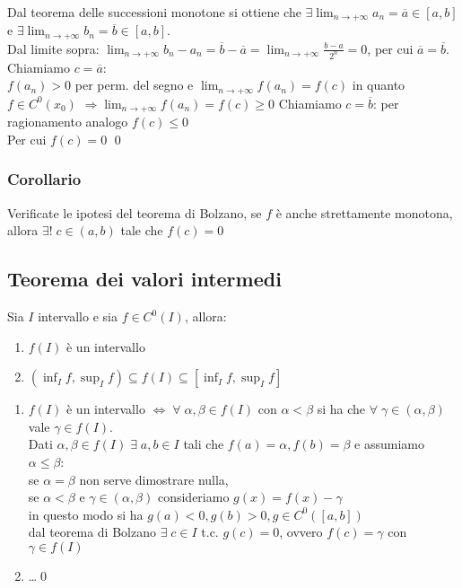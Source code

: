 \documentclass[a4paper]{article}
\newcommand\cont[2]{C^{#1} ({#2})}
\begin{document}
Dal teorema delle successioni monotone si ottiene che \(\displaystyle \exists \lim_{n \to +\infty} a_n = \overline{a} \in \left[a, b\right]\) e
\(\displaystyle \exists \lim_{n \to +\infty} b_n = \overline{b} \in \left[a, b\right]\).\\
Dal limite sopra: \(\displaystyle \lim_{n \to +\infty} b_n - a_n = \overline{b} - \overline{a} = \lim_{n \to +\infty} \frac{b - a}{2^n} = 0\),
per cui \(\overline{a} = \overline{b}\). \\
Chiamiamo \(c = \overline{a}\): \\
\(f(a_n) > 0\) per perm. del segno e \(\displaystyle \lim_{n \to +\infty}f(a_n) = f(c)\) in quanto \(f \in \cont{0}{x_0}\) \(\displaystyle \Rightarrow \lim_{n \to +\infty} f(a_n) = f(c) \geq 0\) 
Chiamiamo \(c = \overline{b}\): per ragionamento analogo \(f(c) \leq 0\) \\
Per cui \(f(c) = 0\) \qed

\subsubsection*{Corollario}
Verificate le ipotesi del teorema di Bolzano, se \(f\) è anche strettamente monotona, allora \(\exists! \; c \in \left(a, b\right)\) tale che \(f(c) = 0\)

\subsection{Teorema dei valori intermedi}
Sia \(I\) intervallo e sia \(f \in \cont{0}{I}\), allora:
\begin{enumerate}
	\item \(f(I)\) è un intervallo
	\item \(\displaystyle \left(\inf_I f, \sup_I f\right) \subseteq f(I) \subseteq \left[\inf_I f, \sup_I f\right]\)
\end{enumerate}
\begin{enumerate}
	\item \(f(I)\) è un intervallo \(\Leftrightarrow \; \forall \; \alpha, \beta \in f(I)\) con \(\alpha < \beta\) si ha che \(\forall \; \gamma \in \left(\alpha, \beta\right)\) vale \(\gamma \in f(I)\). \\
	Dati \(\alpha, \beta \in f(I) \; \exists \; a, b \in I \) tali che \(f(a) = \alpha, f(b) = \beta\) e assumiamo \(\alpha \leq \beta\): \\
	se \(\alpha = \beta\) non serve dimostrare nulla, \\
	se \(\alpha < \beta\) e \(\gamma \in \left(\alpha, \beta\right)\) consideriamo \(g(x) = f(x) - \gamma\) \\
	in questo modo si ha \(g(a) < 0, g(b) > 0, g \in \cont{0}{\left[a, b\right]}\) \\
	dal teorema di Bolzano \(\exists \; c \in I\) t.c. \(g(c) = 0\), ovvero \(f(c) = \gamma\) con \(\gamma \in f(I)\)
	\item \dots \qed
\end{enumerate}
\end{document}
